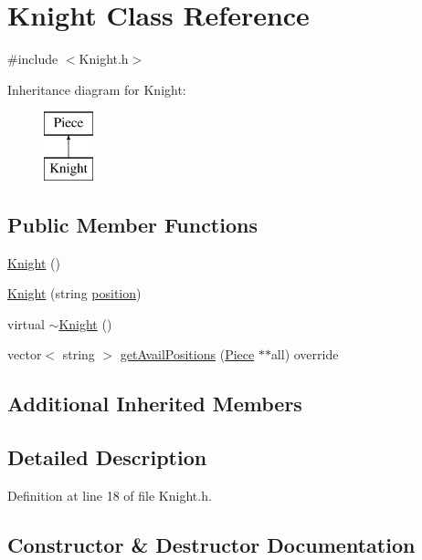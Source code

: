 \hypertarget{class_knight}{}\section{Knight Class Reference}
\label{class_knight}


{\ttfamily \#include $<$Knight.\+h$>$}

Inheritance diagram for Knight\+:\begin{figure}[H]
\begin{center}
\leavevmode
\includegraphics[height=2.000000cm]{class_knight}
\end{center}
\end{figure}
\subsection*{Public Member Functions}
\begin{DoxyCompactItemize}
\item 
\hyperlink{class_knight_aa5c98808cbb05f2772bc3a32ef859387}{Knight} ()
\item 
\hyperlink{class_knight_ae6d6c2e4445aea841a368e2346479481}{Knight} (string \hyperlink{class_piece_a1b93d0ecc14e15fc7f3fb5def518502a}{position})
\item 
virtual \hyperlink{class_knight_a2754123d6876babe915f4da8f761361b}{$\sim$\+Knight} ()
\item 
vector$<$ string $>$ \hyperlink{class_knight_abef9508ede89c70a482ecdd3f08a9d04}{get\+Avail\+Positions} (\hyperlink{class_piece}{Piece} $\ast$$\ast$all) override
\end{DoxyCompactItemize}
\subsection*{Additional Inherited Members}


\subsection{Detailed Description}


Definition at line 18 of file Knight.\+h.



\subsection{Constructor \& Destructor Documentation}
